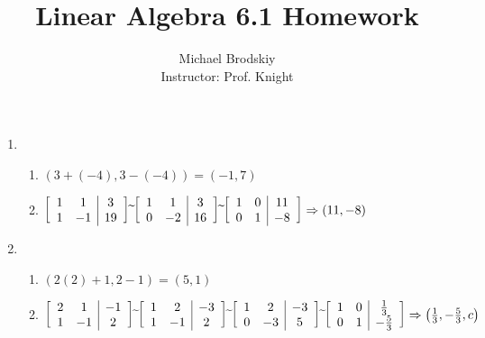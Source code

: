 \documentclass[12pt]{article}
\title{Linear Algebra 6.1 Homework}
\date{}
\author{Michael Brodskiy\\ \small Instructor: Prof. Knight}
\begin{document}
\maketitle

\begin{enumerate}

    \begin{center}
      \underline{1, 6, 11, 13, 16, 19, 21, 23, 25, 29, 33, 36, 37, 39, 45, 48, 55, 56, 57, 58, 63, 65, 69}
    \end{center}

  \item 

    \begin{enumerate}

      \item $(3+(-4), 3-(-4))=(-1,7)$ 

      \item $\left[\begin{array}{c c | c} 1 & 1 & 3\\ 1 & -1 & 19  \end{array}\right]\widetilde{ }\left[\begin{array}{c c | c} 1 & 1 & 3\\ 0 & -2 & 16\\  \end{array}\right]\widetilde{ }\left[\begin{array}{c c | c} 1 & 0 & 11\\ 0 & 1 & -8\\  \end{array}\right]\Rightarrow (11,-8)$

    \end{enumerate}
    
    \setcounter{enumi}{5}

  \item

    \begin{enumerate}

      \item $(2(2)+1, 2-1)=(5,1)$

      \item $\left[ \begin{array}{c c | c} 2 & 1 & -1\\ 1 & -1 & 2  \end{array} \right]\widetilde{ }\left[ \begin{array}{c c | c} 1 & 2 & -3\\ 1 & -1 & 2  \end{array} \right]\widetilde{ }\left[ \begin{array}{c c | c} 1 & 2 & -3\\ 0 & -3 & 5  \end{array} \right]\widetilde{ }\left[ \begin{array}{c c | c} 1 & 0 & \frac{1}{3}\\ 0 & 1 & -\frac{5}{3}  \end{array} \right]\Rightarrow\left( \frac{1}{3},-\frac{5}{3},c \right)$


\end{enumerate}
\end{enumerate}
\end{document}
